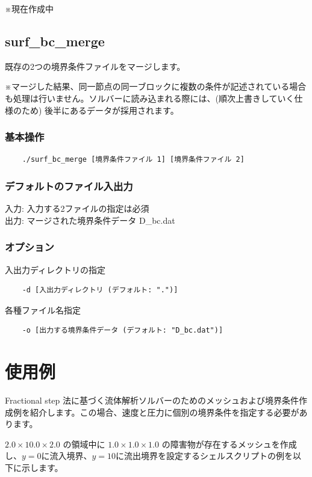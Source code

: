 \documentclass[8pt,a4paper]{article}
\begin{document}
※現在作成中

\subsection{surf\_bc\_merge}
既存の2つの境界条件ファイルをマージします。

※マージした結果、同一節点の同一ブロックに複数の条件が記述されている場合も処理は行いません。ソルバーに読み込まれる際には、(順次上書きしていく仕様のため) 後半にあるデータが採用されます。

\subsubsection*{基本操作}
\begin{verbatim}
	./surf_bc_merge [境界条件ファイル 1] [境界条件ファイル 2]
\end{verbatim}

\subsubsection*{デフォルトのファイル入出力}
入力: 入力する2ファイルの指定は必須 \\ \noindent
出力: マージされた境界条件データ D\_bc.dat

\subsubsection*{オプション}
入出力ディレクトリの指定
\begin{verbatim}
    -d [入出力ディレクトリ (デフォルト: ".")]
\end{verbatim}
各種ファイル名指定
\begin{verbatim}
    -o [出力する境界条件データ (デフォルト: "D_bc.dat")]
\end{verbatim}

\section{使用例}
Fractional step 法に基づく流体解析ソルバーのためのメッシュおよび境界条件作成例を紹介します。この場合、速度と圧力に個別の境界条件を指定する必要があります。

$2.0 \times 10.0 \times 2.0$ の領域中に $1.0 \times 1.0 \times 1.0$ の障害物が存在するメッシュを作成し、$y=0$に流入境界、$y=10$に流出境界を設定するシェルスクリプトの例を以下に示します。
\end{document}
